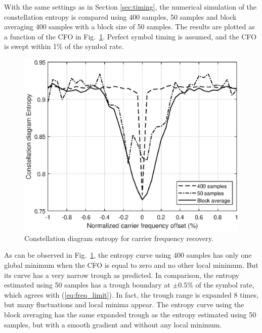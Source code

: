 \documentclass[12pt, draftclsnofoot, onecolumn]{IEEEtran}
\begin{document}
With the same settings as in Section \ref{sec:timing}, the numerical simulation of the constellation entropy is compared using 400 samples, 50 samples and block averaging 400 samples with a block size of 50 samples.
The results are plotted as a function of the CFO in Fig.~\ref{fig:freq_entp}.
Perfect symbol timing is assumed, and the CFO is swept within 1\% of the symbol rate.



\begin{figure}[ht]
\centering
\includegraphics[width=3 in]{pic/freq-k.eps}
\caption{Constellation diagram entropy for carrier frequency recovery.}
\label{fig:freq_entp} 
\end{figure}   

As can be observed in Fig.~\ref{fig:freq_entp}, the entropy curve using 400 samples has only one global minimum when the CFO is equal to zero and no other local minimum.
But its curve has a very narrow trough as predicted.
In comparison, the entropy estimated using 50 samples has a trough boundary at \(\pm 0.5\%\) of the symbol rate, which agrees with (\ref{eq:freq_limit}).
In fact, the trough range is expanded 8 times, but many fluctuations and local minima appear.
The entropy curve using the block averaging has the same expanded trough as the entropy estimated using 50 samples, but with a smooth gradient and without any local minimum.
\end{document}
